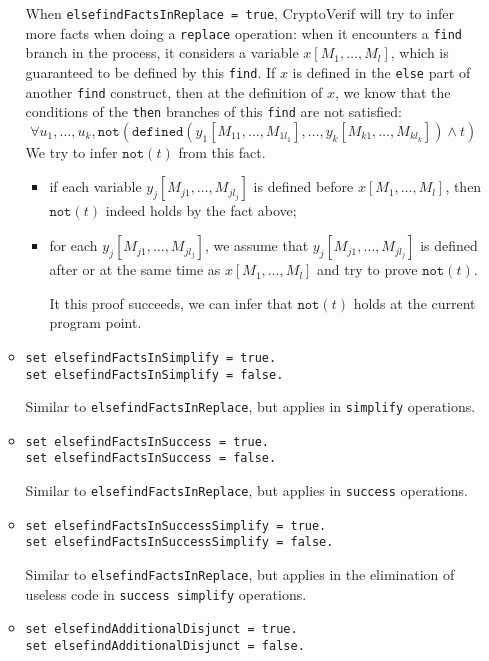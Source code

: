 \begin{itemize}
\begin{itemize}
When \texttt{elsefindFactsInReplace = true}, CryptoVerif will try to
infer more facts when doing a \texttt{replace} operation: when it
encounters a \texttt{find} branch in the process, it considers a
variable $x[M_1, \ldots, M_l]$, which is guaranteed to be defined by this \texttt{find}.
If $x$ is defined in the \texttt{else} part of another \texttt{find}
construct, then at the definition of $x$, we know that the conditions
of the \texttt{then} branches of this \texttt{find} are not satisfied:
\[\forall u_1, \ldots, u_k, \texttt{not}(\texttt{defined}(y_1[M_{11}, \ldots, M_{1l_1}], \ldots, y_k[M_{k1}, \ldots, M_{kl_k}]) \wedge t)\]
We try to infer $\texttt{not}(t)$ from this fact.
\begin{itemize}
\item if each variable $y_j[M_{j1}, \ldots, M_{jl_j}]$ is defined before $x[M_1, \ldots, M_l]$,
then $\texttt{not}(t)$ indeed holds by the fact above;
\item for each $y_j[M_{j1}, \ldots, M_{jl_j}]$, 
we assume that $y_j[M_{j1}, \ldots, M_{jl_j}]$ is defined after or at the same time as $x[M_1, \ldots, M_l]$
and try to prove $\texttt{not}(t)$.

It this proof succeeds, we can infer that $\texttt{not}(t)$ holds
at the current program point.
\end{itemize}

\item \texttt{set elsefindFactsInSimplify = true.}\\
\texttt{set elsefindFactsInSimplify = false.}

Similar to \texttt{elsefindFactsInReplace}, but applies in
\texttt{simplify} operations. 

\item \texttt{set elsefindFactsInSuccess = true.}\\
\texttt{set elsefindFactsInSuccess = false.}

Similar to \texttt{elsefindFactsInReplace}, but applies in
\texttt{success} operations. 

\item \texttt{set elsefindFactsInSuccessSimplify = true.}\\
\texttt{set elsefindFactsInSuccessSimplify = false.}

Similar to \texttt{elsefindFactsInReplace}, but applies in
the elimination of useless code in \texttt{success simplify} operations. 


\item \texttt{set elsefindAdditionalDisjunct = true.}\\
\texttt{set elsefindAdditionalDisjunct = false.}


\end{itemize}
\end{itemize}
